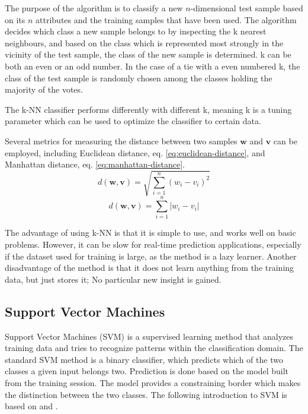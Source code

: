 The purpose of the algorithm is to classify a
new \(n\)-dimensional test sample based on its \(n\) attributes
and the training samples that have been used.
The algorithm decides which class a new sample belongs to by
inspecting the k nearest neighbours,
and based on the class which is represented most strongly in the vicinity
of the test sample,
the class of the new sample is determined.
k can be both an even or an odd number.
In the case of a tie with a even numbered k,
the class of the test sample is randomly chosen among the classes holding
the majority of the votes.

The k-NN classifier performs differently with different k,
meaning k is a tuning parameter which can be used to optimize the classifier
to certain data.

Several metrics for measuring the distance between
two samples \(\mathbf{w}\) and \(\mathbf{v}\) can be employed,
including Euclidean distance, eq. \eqref{eq:euclidean-distance},
and Manhattan distance, eq. \eqref{eq:manhattan-distance}.
\begin{equation}
d(\mathbf{w},\mathbf{v}) = \sqrt{\sum_{i=1}^n (w_i - v_i)^2}
\label{eq:euclidean-distance}
\end{equation}
\begin{equation}
d(\mathbf{w},\mathbf{v}) = \sum_{i=1}^n \left|w_i - v_i\right|
\label{eq:manhattan-distance}
\end{equation}

The advantage of using k-NN is that it is simple to use,
and works well on basic problems.
However, it can be slow for real-time prediction applications,
especially if the dataset used for training is large,
as the method is a lazy learner.
Another disadvantage of the method is that it does not
learn anything from the training data, but just stores it;
No particular new insight is gained.
 
\subsection{Support Vector Machines}
Support Vector Machines (SVM) is a supervised learning
method that analyzes training data 
and tries to recognize patterns within the classification domain.
The standard SVM method is a binary classifier,
which predicts which of the two classes a given input belongs two. 
Prediction is done based on the model built from the training session.
The model provides a constraining border which makes the distinction
between the two classes.
The following introduction to SVM is based on \citep{svmwiki} and \citep{mlwr}.

